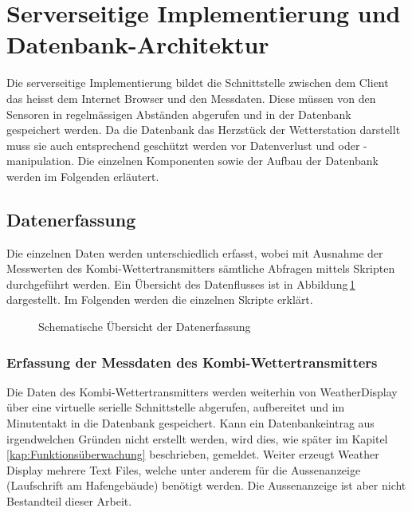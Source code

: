 \section{Serverseitige Implementierung und Datenbank-Architektur}
Die serverseitige Implementierung bildet die Schnittstelle zwischen dem Client das heisst dem Internet Browser und den Messdaten. Diese müssen von den Sensoren in regelmässigen Abständen abgerufen und in der Datenbank gespeichert werden. Da die Datenbank das Herzstück der Wetterstation darstellt muss sie auch entsprechend geschützt werden vor Datenverlust und oder -manipulation. Die einzelnen Komponenten sowie der Aufbau der Datenbank werden im Folgenden erläutert.

\subsection{Datenerfassung}
Die einzelnen Daten werden unterschiedlich erfasst, wobei mit Ausnahme der Messwerten des Kombi-Wettertransmitters sämtliche Abfragen mittels Skripten durchgeführt werden. Ein Übersicht des Datenflusses ist in Abbildung\,\ref{img:datenerfassung} dargestellt. Im Folgenden werden die einzelnen Skripte erklärt.

\begin{figure}[htbp!]
	\centering
	\caption{Schematische Übersicht der Datenerfassung}
	\label{img:datenerfassung}
\end{figure}


\subsubsection{Erfassung der Messdaten des Kombi-Wettertransmitters}
Die Daten des Kombi-Wettertransmitters werden weiterhin von WeatherDisplay über eine virtuelle serielle Schnittstelle abgerufen, aufbereitet und im Minutentakt in die Datenbank gespeichert. Kann ein Datenbankeintrag aus irgendwelchen Gründen nicht erstellt werden, wird dies, wie später im Kapitel\,\ref{kap:Funktionsüberwachung} beschrieben, gemeldet. Weiter erzeugt Weather Display mehrere Text Files, welche unter anderem für die Aussenanzeige (Laufschrift am Hafengebäude) benötigt werden. Die Aussenanzeige ist aber nicht Bestandteil dieser Arbeit.


